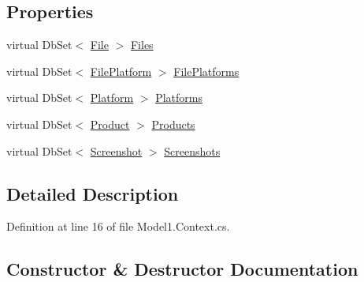 \subsection*{Properties}
\begin{DoxyCompactItemize}
\item 
virtual Db\+Set$<$ \hyperlink{class_open_1_1_g_i_1_1hypermart_1_1_models_1_1_file}{File} $>$ \hyperlink{class_open_1_1_g_i_1_1hypermart_1_1_models_1_1_model1_container_a446f391e8b281cf4e3e71f369940189c}{Files}
\item 
virtual Db\+Set$<$ \hyperlink{class_open_1_1_g_i_1_1hypermart_1_1_models_1_1_file_platform}{File\+Platform} $>$ \hyperlink{class_open_1_1_g_i_1_1hypermart_1_1_models_1_1_model1_container_ad8999f3ba131f3c46c9162b2eff4c7f9}{File\+Platforms}
\item 
virtual Db\+Set$<$ \hyperlink{class_open_1_1_g_i_1_1hypermart_1_1_models_1_1_platform}{Platform} $>$ \hyperlink{class_open_1_1_g_i_1_1hypermart_1_1_models_1_1_model1_container_a47b249679414da9e63797516568ddb73}{Platforms}
\item 
virtual Db\+Set$<$ \hyperlink{class_open_1_1_g_i_1_1hypermart_1_1_models_1_1_product}{Product} $>$ \hyperlink{class_open_1_1_g_i_1_1hypermart_1_1_models_1_1_model1_container_a3152c9cb162bad57e707fb1a6b48152c}{Products}
\item 
virtual Db\+Set$<$ \hyperlink{class_open_1_1_g_i_1_1hypermart_1_1_models_1_1_screenshot}{Screenshot} $>$ \hyperlink{class_open_1_1_g_i_1_1hypermart_1_1_models_1_1_model1_container_a16840948ed271ebac66728f3398b6696}{Screenshots}
\end{DoxyCompactItemize}


\subsection{Detailed Description}


Definition at line 16 of file Model1.\+Context.\+cs.



\subsection{Constructor \& Destructor Documentation}
\hypertarget{class_open_1_1_g_i_1_1hypermart_1_1_models_1_1_model1_container_a8d957335d29c47427c9d9062c11e6205}{}
